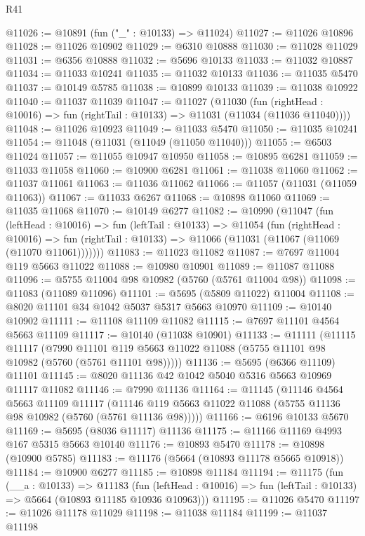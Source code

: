 \begin{lexlean}{R41}
\begin{coremodule}
@11026 := @10891 (fun ("_" : @10133) => @11024)
@11027 := @11026 @10896
@11028 := @11026 @10902
@11029 := @6310 @10888
@11030 := @11028 @11029
@11031 := @6356 @10888
@11032 := @5696 @10133
@11033 := @11032 @10887
@11034 := @11033 @10241
@11035 := @11032 @10133
@11036 := @11035 @5470
@11037 := @10149 @5785
@11038 := @10899 @10133
@11039 := @11038 @10922
@11040 := @11037 @11039
@11047 := @11027
    (@11030
      (fun (rightHead : @10016) => fun (rightTail : @10133) => @11031 (@11034 (@11036 @11040))))
@11048 := @11026 @10923
@11049 := @11033 @5470
@11050 := @11035 @10241
@11054 := @11048 (@11031 (@11049 (@11050 @11040)))
@11055 := @6503 @11024
@11057 := @11055 @10947 @10950
@11058 := @10895 @6281
@11059 := @11033 @11058
@11060 := @10900 @6281
@11061 := @11038 @11060
@11062 := @11037 @11061
@11063 := @11036 @11062
@11066 := @11057 (@11031 (@11059 @11063))
@11067 := @11033 @6267
@11068 := @10898 @11060
@11069 := @11035 @11068
@11070 := @10149 @6277
@11082 := @10990
    (@11047
      (fun (leftHead : @10016) =>
      fun (leftTail : @10133) =>
      @11054
        (fun (rightHead : @10016) =>
        fun (rightTail : @10133) => @11066 (@11031 (@11067 (@11069 (@11070 @11061)))))))
@11083 := @11023 @11082
@11087 := @7697 @11004 @119 @5663 @11022
@11088 := @10980 @10901
@11089 := @11087 @11088
@11096 := @5755 @11004 @98 @10982 (@5760 (@5761 @11004 @98))
@11098 := @11083 (@11089 @11096)
@11101 := @5695 (@5809 @11022) @11004
@11108 := @8020 @11101 @34 @1042 @5037 @5317 @5663 @10970
@11109 := @10140 @10902
@11111 := @11108 @11109 @11082
@11115 := @7697 @11101 @4564 @5663 @11109
@11117 := @10140 (@11038 @10901)
@11133 := @11111
    (@11115
      @11117
      (@7990 @11101 @119 @5663 @11022 @11088 (@5755 @11101 @98 @10982 (@5760 (@5761 @11101 @98)))))
@11136 := @5695 (@6366 @11109) @11101
@11145 := @8020 @11136 @42 @1042 @5040 @5316 @5663 @10969 @11117 @11082
@11146 := @7990 @11136
@11164 := @11145
    (@11146
      @4564
      @5663
      @11109
      @11117
      (@11146 @119 @5663 @11022 @11088 (@5755 @11136 @98 @10982 (@5760 (@5761 @11136 @98)))))
@11166 := @6196 @10133 @5670
@11169 := @5695 (@8036 @11117) @11136
@11175 := @11166 @11169 @4993 @167 @5315 @5663 @10140
@11176 := @10893 @5470
@11178 := @10898 (@10900 @5785)
@11183 := @11176 (@5664 (@10893 @11178 @5665 @10918))
@11184 := @10900 @6277
@11185 := @10898 @11184
@11194 := @11175
    (fun (__a : @10133) =>
    @11183
      (fun (leftHead : @10016) => fun (leftTail : @10133) => @5664 (@10893 @11185 @10936 @10963)))
@11195 := @11026 @5470
@11197 := @11026 @11178 @11029
@11198 := @11038 @11184
@11199 := @11037 @11198

\end{coremodule}
\end{lexlean}
